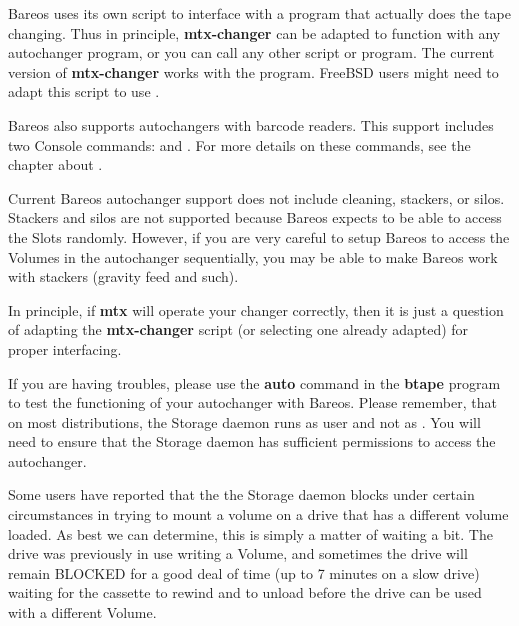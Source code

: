 Bareos uses its own  script to interface with a program
that actually does the tape changing.  Thus in principle, {\bf mtx-changer}
can be adapted to function with any autochanger program, or you can
call any other script or program. The current
version of {\bf mtx-changer} works with the  program.
FreeBSD users might need to adapt this script to use .

Bareos also supports autochangers with barcode
readers. This support includes two Console commands: 
and . For more details on these commands, see the chapter about .

Current Bareos autochanger support does not include cleaning, stackers, or
silos. Stackers and silos are not supported because Bareos expects to
be able to access the Slots randomly.
However, if you are very careful to setup Bareos to access the Volumes
in the autochanger sequentially, you may be able to make Bareos
work with stackers (gravity feed and such).

In principle, if {\bf mtx} will operate your changer correctly, then it is
just a question of adapting the {\bf mtx-changer} script (or selecting one
already adapted) for proper interfacing.



If you are having troubles, please use the {\bf auto} command in the {\bf
btape} program to test the functioning of your autochanger with Bareos.
Please remember, that on most distributions, the Storage daemon
runs as user  and not as .
You will need to ensure that the Storage daemon has sufficient
permissions to access the autochanger.

Some users have reported that the the Storage daemon blocks under certain
circumstances in trying to mount a volume on a drive that has a different
volume loaded.  As best we can determine, this is simply a matter of
waiting a bit.  The drive was previously in use writing a Volume, and
sometimes the drive will remain BLOCKED for a good deal of time (up to 7
minutes on a slow drive) waiting for the cassette to rewind and to unload
before the drive can be used with a different Volume.

